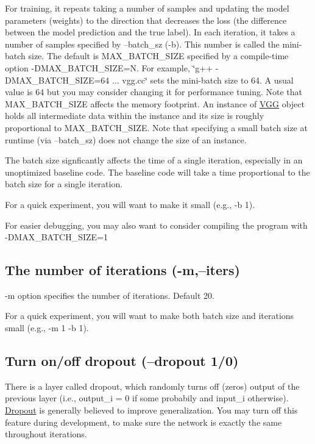 For training, it repeats taking a number of samples and updating the model parameters (weights) to the direction that decreases the loss (the difference between the model prediction and the true label). In each iteration, it takes a number of samples specified by --batch\+\_\+sz (-\/b). This number is called the mini-\/batch size. The default is M\+A\+X\+\_\+\+B\+A\+T\+C\+H\+\_\+\+S\+I\+ZE specified by a compile-\/time option -\/\+D\+M\+A\+X\+\_\+\+B\+A\+T\+C\+H\+\_\+\+S\+I\+ZE=N. For example, \char`\"{}g++ -\/\+D\+M\+A\+X\+\_\+\+B\+A\+T\+C\+H\+\_\+\+S\+I\+Z\+E=64 ... vgg.\+cc\char`\"{} sets the mini-\/batch size to 64. A usual value is 64 but you may consider changing it for performance tuning. Note that M\+A\+X\+\_\+\+B\+A\+T\+C\+H\+\_\+\+S\+I\+ZE affects the memory footprint. An instance of \hyperlink{structVGG}{V\+GG} object holds all intermediate data within the instance and its size is roughly proportional to M\+A\+X\+\_\+\+B\+A\+T\+C\+H\+\_\+\+S\+I\+ZE. Note that specifying a small batch size at runtime (via --batch\+\_\+sz) does not change the size of an instance.

The batch size signficantly affects the time of a single iteration, especially in an unoptimized baseline code. The baseline code will take a time proportional to the batch size for a single iteration.

For a quick experiment, you will want to make it small (e.\+g., -\/b 1).

For easier debugging, you may also want to consider compiling the program with -\/\+D\+M\+A\+X\+\_\+\+B\+A\+T\+C\+H\+\_\+\+S\+I\+ZE=1

\subsection*{The number of iterations (-\/m,--iters) }

-\/m option specifies the number of iterations. Default 20.

For a quick experiment, you will want to make both batch size and iterations small (e.\+g., -\/m 1 -\/b 1).

\subsection*{Turn on/off dropout (--dropout 1/0) }

There is a layer called dropout, which randomly turns off (zeros) output of the previous layer (i.\+e., output\+\_\+i = 0 if some probabily and input\+\_\+i otherwise). \hyperlink{structDropout}{Dropout} is generally believed to improve generalization. You may turn off this feature during development, to make sure the network is exactly the same throughout iterations.

